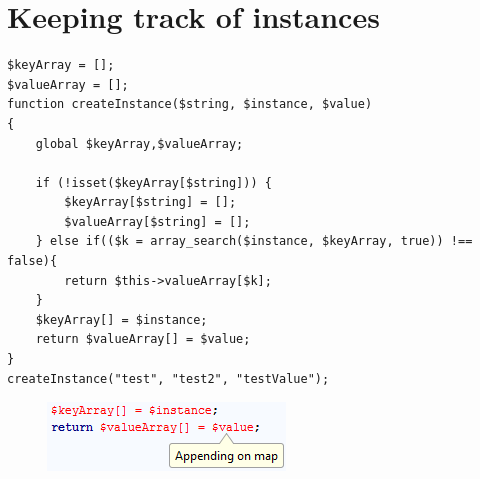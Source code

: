 \section{Keeping track of instances}


\begin{program}
\begin{lstlisting}
$keyArray = [];
$valueArray = [];
function createInstance($string, $instance, $value)
{
    global $keyArray,$valueArray;

    if (!isset($keyArray[$string])) {
        $keyArray[$string] = [];
        $valueArray[$string] = [];
    } else if(($k = array_search($instance, $keyArray, true)) !== false){
        return $this->valueArray[$k];
    }
    $keyArray[] = $instance;
    return $valueArray[] = $value;
}
createInstance("test", "test2", "testValue");
\end{lstlisting}
\caption{}
\label{lst:typeHandler}
\end{program}

\begin{figure}
\centering
\includegraphics{chapters/caseStudy/typeHandlerError}
\caption{}
\label{fig:typeHandlerScreenshot}
\end{figure}